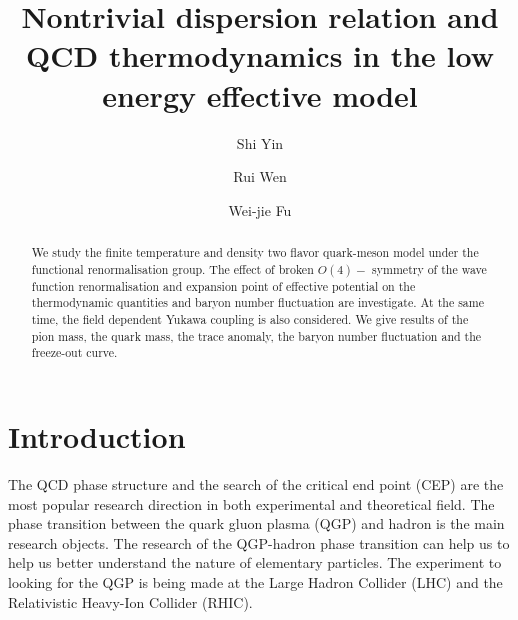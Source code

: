 \documentclass[%
reprint,
superscriptaddress,
showpacs,preprintnumbers,
 amsmath,amssymb,
 aps,
prd,
]{revtex4-1}
\begin{document}
\preprint{}

\title{Nontrivial dispersion relation and QCD thermodynamics in the low energy effective model
}

\author{Shi Yin}

\author{Rui Wen}

\author{Wei-jie Fu}


\begin{abstract}
We study the finite temperature and density two flavor quark-meson model under the functional renormalisation group. The effect of broken $O(4)-$ symmetry of the wave function  renormalisation and expansion point of effective potential on the thermodynamic quantities and baryon number fluctuation are investigate. At the same time, the field dependent Yukawa coupling is also considered. We give results of the pion mass, the quark mass, the trace anomaly, the baryon number fluctuation and the freeze-out curve.
\end{abstract}

\maketitle



\section{Introduction}

The QCD phase structure and the search of the critical end point (CEP) are the most popular research direction in both experimental and theoretical field. The phase transition between the quark gluon plasma (QGP) and hadron is the main research objects. The research of the QGP-hadron phase transition can help us to help us better understand the nature of elementary particles. The experiment to looking for the QGP is being made at the Large Hadron Collider (LHC) and the Relativistic Heavy-Ion Collider (RHIC).
\end{document}
